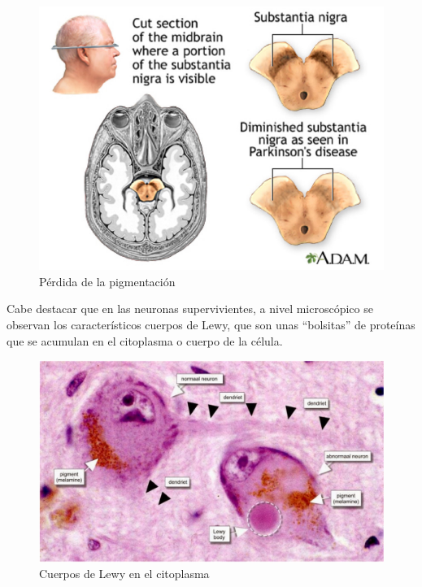 \begin{figure}[H] %
	\centering
	\includegraphics[scale=0.4]{pigme.png}  %
	\caption{Pérdida de la pigmentación} 
	\label{fig:pigmentacion}
\end{figure}

Cabe destacar que en las neuronas supervivientes, a nivel microscópico se observan los característicos cuerpos de Lewy, que son unas ``bolsitas'' de proteínas que se acumulan en el citoplasma o cuerpo de la célula.

\begin{figure}[H] %
	\centering
	\includegraphics[scale=0.3]{cito.png}  %
	\caption{Cuerpos de Lewy en el citoplasma} 
	\label{fig:lewy}
\end{figure}

